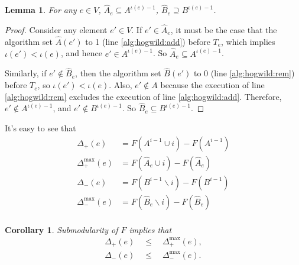 \documentclass{article} %
\newtheorem{cor}[thm]{Corollary}
\newtheorem{lem}[thm]{Lemma}
\begin{document}
\begin{lem}\label{lem:set_bound} For any $e\in V$, $\hat{A}_e \subseteq A^{\iota(e)-1}$, $\hat{B}_e \supseteq B^{\iota(e)-1}$.
\end{lem}
\begin{proof}
Consider any element $e'\in V$.
If $e'\in \hat{A}_e$, it must be the case that the algorithm set $\hat{A}(e')$ to 1 (line \ref{alg:hogwild:add}) before $T_e$, which implies $\iota(e') < \iota(e)$, and hence $e' \in A^{\iota(e)-1}$.
So $\hat{A}_e \subseteq A^{\iota(e)-1}$.

Similarly, if $e'\not\in \hat{B}_e$, then the algorithm set $\hat{B}(e')$ to 0 (line \ref{alg:hogwild:rem}) before $T_e$, so $\iota(e') < \iota(e)$.
Also, $e'\not\in A$ because the execution of line \ref{alg:hogwild:rem} excludes the execution of line \ref{alg:hogwild:add}.
Therefore, $e'\not\in A^{\iota(e)-1}$, and $e'\not\in B^{\iota(e)-1}$.
So $\hat{B}_e \subseteq B^{\iota(e)-1}$.
\end{proof}

It's easy to see that
\begin{align*}
\Delta_{+}       (e) &= F(A^{i-1}\cup i) - F(A^{i-1})\\
\Delta_{+}^{\max}(e) &= F(\hat{A}_e\cup i) - F(\hat{A}_e)\\
\Delta_{-}       (e) &= F(B^{i-1}\backslash i) - F(B^{i-1})\\
\Delta_{-}^{\max}(e) &= F(\hat{B}_e\backslash i) - F(\hat{B}_e)\\
\end{align*}

\begin{cor}\label{cor:delta_bound}
Submodularity of $F$ implies that
\begin{align*}
\Delta_{+}(e) \quad\leq\quad \Delta_{+}^{\max}(e),\\
\Delta_{-}(e) \quad\leq\quad \Delta_{-}^{\max}(e).
\end{align*}
\end{cor}
\end{document}
